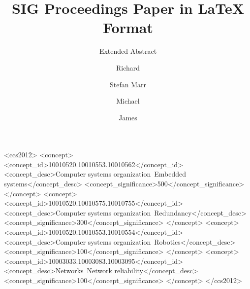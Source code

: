 \documentclass[sigplan, review]{acmart}
\begin{document}
\title{SIG Proceedings Paper in LaTeX Format}
\subtitle{Extended Abstract}

\author{Richard}
\orcid{}
\affiliation{%
    \department{}
    \institution{}
    \city{}
    \postcode{}
    \country{}
}
\email{}


\author{Stefan Marr}

\author{Michael}
\orcid{}
\affiliation{%
    \department{}
    \institution{}
    \city{}
    \postcode{}
    \country{}
}
\email{}

\author{James}
\orcid{}
\affiliation{%
    \department{}
    \institution{}
    \city{}
    \postcode{}
    \country{}
}
\email{}

\renewcommand{\shortauthors}{R. Roberts et al.}




%
%
\begin{CCSXML}
<ccs2012>
 <concept>
  <concept_id>10010520.10010553.10010562</concept_id>
  <concept_desc>Computer systems organization~Embedded systems</concept_desc>
  <concept_significance>500</concept_significance>
 </concept>
 <concept>
  <concept_id>10010520.10010575.10010755</concept_id>
  <concept_desc>Computer systems organization~Redundancy</concept_desc>
  <concept_significance>300</concept_significance>
 </concept>
 <concept>
  <concept_id>10010520.10010553.10010554</concept_id>
  <concept_desc>Computer systems organization~Robotics</concept_desc>
  <concept_significance>100</concept_significance>
 </concept>
 <concept>
  <concept_id>10003033.10003083.10003095</concept_id>
  <concept_desc>Networks~Network reliability</concept_desc>
  <concept_significance>100</concept_significance>
 </concept>
</ccs2012>
\end{CCSXML}

\end{document}
